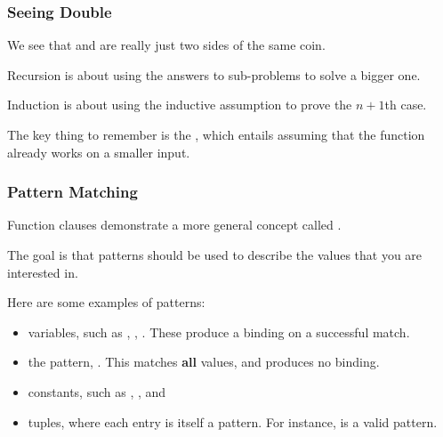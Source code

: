 \documentclass[aspectratio=169]{beamer}
\begin{document}
\begin{frame}[fragile]
  \frametitle{Seeing Double} 

  We see that  and  are really just two sides of the same coin.

  \vspace{\fill}

  Recursion is about using the answers to sub-problems to solve a bigger one.

  \vspace{\fill}

  Induction is about using the inductive assumption to prove the $n + 1$th case.

  \vspace{\fill}

  The key thing to remember is the , which entails
  assuming that the function already works on a smaller input.
\end{frame}


\begin{frame}[fragile]
  \frametitle{Pattern Matching}

  Function clauses demonstrate a more general concept called 
  .

  \vspace{\fill}


  \vspace{5pt}

  The goal is that patterns should be used to describe the values that you are interested
  in.

  \vspace{\fill}

  Here are some examples of patterns:
  \begin{itemize}
    \item variables, such as , , . These produce a binding on a successful match.
    \item the  pattern, \code{_}. This matches \textbf{all} values, and 
    produces no binding.
    \item constants, such as , , and 
    \item tuples, where each entry is itself a pattern. For instance,  is 
    a valid pattern.
  \end{itemize}
\end{frame}
\end{document}
